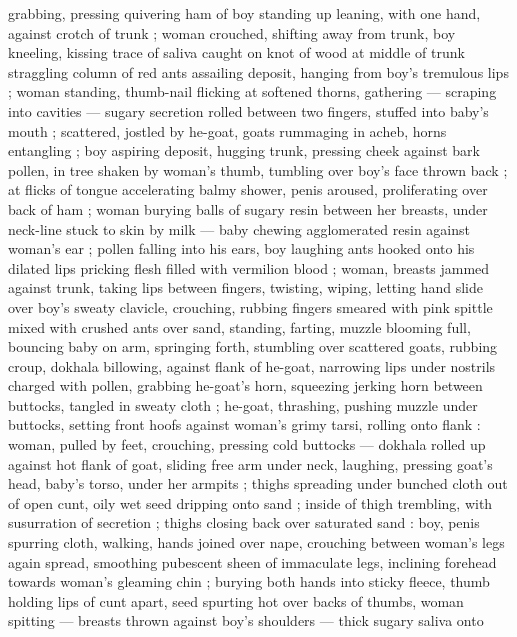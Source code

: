 grabbing, pressing quivering ham of boy standing up leaning, with 
one hand, against crotch of trunk ; woman crouched, shifting away 
from trunk, boy kneeling, kissing trace of saliva caught on knot of 
wood at middle of trunk {\col} straggling column of red ants assailing 
deposit, hanging from boy's tremulous lips ; woman standing, 
thumb-nail flicking at softened thorns, gathering --- scraping into 
cavities --- sugary secretion {\col} rolled between two fingers, stuffed into 
baby's mouth ; scattered, jostled by he-goat, goats rummaging in 
acheb, horns entangling ; boy aspiring deposit, hugging trunk, 
pressing cheek against bark {\col} pollen, in tree shaken by woman's 
thumb, tumbling over boy's face thrown back ; at flicks of tongue 
accelerating balmy shower, penis aroused, proliferating over back of 
ham ; woman burying balls of sugary resin between her breasts, 
under neck-line stuck to skin by milk --- baby chewing agglomerated 
resin against woman's ear ; pollen falling into his ears, boy laughing 
{\col} ants hooked onto his dilated lips {\col} pricking flesh filled with vermilion 
blood ; woman, breasts jammed against trunk, taking lips between 
fingers, twisting, wiping, letting hand slide over boy's sweaty clavicle, 
crouching, rubbing fingers smeared with pink spittle mixed with 
crushed ants over sand, standing, farting, muzzle blooming full, 
bouncing baby on arm, springing forth, stumbling over scattered 
goats, rubbing croup, dokhala billowing, against flank of he-goat, 
narrowing lips under nostrils charged with pollen, grabbing he-goat's 
horn, squeezing jerking horn between buttocks, tangled in sweaty 
cloth ; he-goat, thrashing, pushing muzzle under buttocks, setting 
front hoofs against woman's grimy tarsi, rolling onto flank : woman, 
pulled by feet, crouching, pressing cold buttocks --- dokhala rolled 
up against hot flank of goat, sliding free arm under neck, laughing, 
pressing goat's head, baby's torso, under her armpits ; thighs 
spreading under bunched cloth {\col} out of open cunt, oily wet seed 
dripping onto sand ; inside of thigh trembling, with susurration of 
secretion ; thighs closing back over saturated sand : boy, penis 
spurring cloth, walking, hands joined over nape, crouching between 
woman's legs again spread, smoothing pubescent sheen of 
immaculate legs, inclining forehead towards woman's gleaming chin 
; burying both hands into sticky fleece, thumb holding lips of cunt 
apart, seed spurting hot over backs of thumbs, woman spitting --- 
breasts thrown against boy's shoulders --- thick sugary saliva onto 
